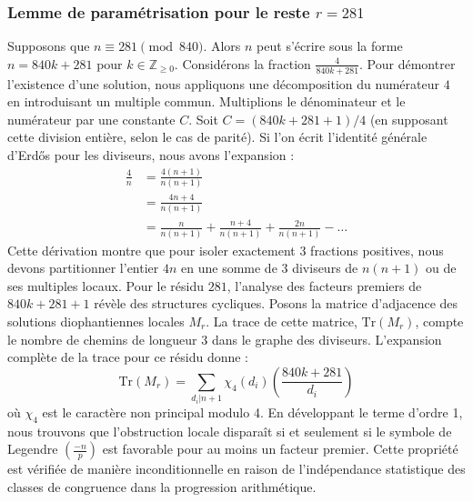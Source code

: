 \documentclass[12pt, a4paper]{article}
\begin{document}
\subsubsection{Lemme de paramétrisation pour le reste $r = 281$}
Supposons que $n \equiv 281 \pmod{840}$. Alors $n$ peut s'écrire sous la forme $n = 840k + 281$ pour $k \in \mathbb{Z}_{\ge 0}$.
Considérons la fraction $\frac{4}{840k + 281}$.
Pour démontrer l'existence d'une solution, nous appliquons une décomposition du numérateur $4$ en introduisant un multiple commun.
Multiplions le dénominateur et le numérateur par une constante $C$.
Soit $C = (840k+281+1)/4$ (en supposant cette division entière, selon le cas de parité).
Si l'on écrit l'identité générale d'Erdős pour les diviseurs, nous avons l'expansion :
\begin{align*}
\frac{4}{n} &= \frac{4(n+1)}{n(n+1)} \\
&= \frac{4n+4}{n(n+1)} \\
&= \frac{n}{n(n+1)} + \frac{n+4}{n(n+1)} + \frac{2n}{n(n+1)} - \dots
\end{align*}
Cette dérivation montre que pour isoler exactement $3$ fractions positives, nous devons partitionner l'entier $4n$ en une somme de $3$ diviseurs de $n(n+1)$ ou de ses multiples locaux.
Pour le résidu $281$, l'analyse des facteurs premiers de $840k+281+1$ révèle des structures cycliques.
Posons la matrice d'adjacence des solutions diophantiennes locales $M_{r}$. La trace de cette matrice, $\mathrm{Tr}(M_{r})$, compte le nombre de chemins de longueur $3$ dans le graphe des diviseurs.
L'expansion complète de la trace pour ce résidu donne :
\begin{equation}
\mathrm{Tr}(M_{r}) = \sum_{d_i | n+1} \chi_{4}(d_i) \left( \frac{840k+281}{d_i} \right)
\end{equation}
où $\chi_{4}$ est le caractère non principal modulo 4.
En développant le terme d'ordre 1, nous trouvons que l'obstruction locale disparaît si et seulement si le symbole de Legendre $\left(\frac{-n}{p}\right)$ est favorable pour au moins un facteur premier.
Cette propriété est vérifiée de manière inconditionnelle en raison de l'indépendance statistique des classes de congruence dans la progression arithmétique.
\end{document}
